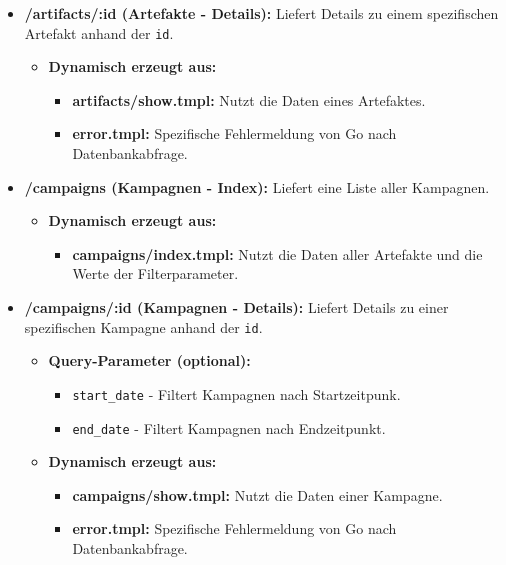 \begin{itemize}
    \item \textbf{/artifacts/:id (Artefakte - Details):} Liefert Details zu einem spezifischen Artefakt anhand der \texttt{id}.
          \begin{itemize}
              \item \textbf{Dynamisch erzeugt aus:}
                    \begin{itemize}
                        \item \textbf{artifacts/show.tmpl:} Nutzt die Daten eines Artefaktes.
                        \item \textbf{error.tmpl:} Spezifische Fehlermeldung von Go nach Datenbankabfrage.
                    \end{itemize}

          \end{itemize}

    \item \textbf{/campaigns (Kampagnen - Index):} Liefert eine Liste aller Kampagnen.
          \begin{itemize}
              \item \textbf{Dynamisch erzeugt aus:}
                    \begin{itemize}
                        \item \textbf{campaigns/index.tmpl:} Nutzt die Daten aller Artefakte und die Werte der Filterparameter.
                    \end{itemize}
          \end{itemize}

    \item \textbf{/campaigns/:id (Kampagnen - Details):} Liefert Details zu einer spezifischen Kampagne anhand der \texttt{id}.
    \begin{itemize}
    \item \textbf{Query-Parameter (optional):}
          \begin{itemize}
              \item \texttt{start\_date} - Filtert Kampagnen nach Startzeitpunk.
              \item \texttt{end\_date} - Filtert Kampagnen nach Endzeitpunkt.
          \end{itemize}
    \item \textbf{Dynamisch erzeugt aus:}
            \begin{itemize}
                \item \textbf{campaigns/show.tmpl:} Nutzt die Daten einer Kampagne.
                \item \textbf{error.tmpl:} Spezifische Fehlermeldung von Go nach Datenbankabfrage.
            \end{itemize}
    \end{itemize}
\end{itemize}



